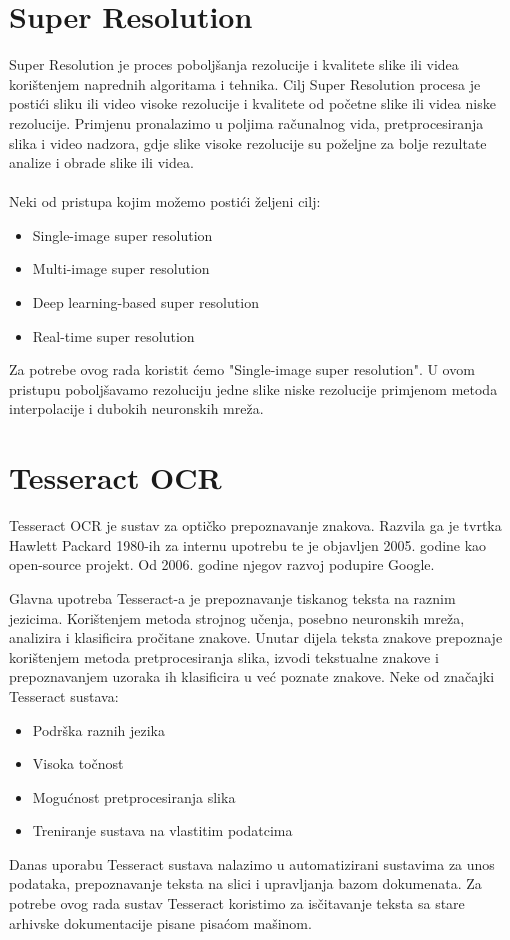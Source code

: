 \documentclass[times, utf8, zavrsni, numeric]{fer}
\begin{document}
\section{Super Resolution}
Super Resolution \cite{superRes} je proces poboljšanja rezolucije i kvalitete slike ili videa korištenjem naprednih algoritama i tehnika. Cilj Super Resolution procesa je postići sliku ili video visoke rezolucije i kvalitete od početne slike ili videa niske rezolucije. Primjenu pronalazimo u poljima računalnog vida, pretprocesiranja slika i video nadzora, gdje slike visoke rezolucije su poželjne za bolje rezultate analize i obrade slike ili videa.
\\
\\
Neki od pristupa kojim možemo postići željeni cilj:
\begin{itemize}
  \item Single-image super resolution 
  \item Multi-image super resolution
  \item Deep learning-based super resolution
  \item Real-time super resolution
\end{itemize}
\hfill \break
Za potrebe ovog rada koristit ćemo "Single-image super resolution". U ovom pristupu poboljšavamo rezoluciju jedne slike niske rezolucije primjenom metoda interpolacije i dubokih neuronskih mreža.
\pagebreak

\section{Tesseract OCR}
Tesseract OCR \cite{tesseract} je sustav za optičko prepoznavanje znakova. Razvila ga je tvrtka Hawlett Packard 1980-ih za internu upotrebu te je objavljen 2005. godine kao open-source projekt. Od 2006. godine njegov razvoj podupire Google. 

Glavna upotreba Tesseract-a je prepoznavanje tiskanog teksta na raznim jezicima. Korištenjem metoda strojnog učenja, posebno neuronskih mreža, analizira i klasificira pročitane znakove. Unutar dijela teksta znakove prepoznaje korištenjem metoda pretprocesiranja slika, izvodi tekstualne znakove i prepoznavanjem uzoraka ih klasificira u već poznate znakove.
\hfill \break
\hfill \break
Neke od značajki Tesseract sustava:
\begin{itemize}
  \item Podrška raznih jezika
  \item Visoka točnost 
  \item Mogućnost pretprocesiranja slika
  \item Treniranje sustava na vlastitim podatcima
\end{itemize}
\hfill \break
Danas uporabu Tesseract sustava nalazimo u automatizirani sustavima za unos podataka, prepoznavanje teksta na slici i upravljanja bazom dokumenata. Za potrebe ovog rada sustav Tesseract koristimo za isčitavanje teksta sa stare arhivske dokumentacije pisane pisaćom mašinom.
\pagebreak
\end{document}
